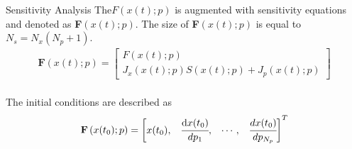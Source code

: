 \documentclass[8pt]{beamer}
\begin{document}
	\begin{frame}[fragile]{Sensitivity Analysis}
		The$F(x(t);p)$ is augmented with sensitivity equations and denoted as \textbf{F}$\left(x(t);p\right)$. The size of \textbf{F}$\left(x(t);p\right)$ is equal to $N_s = N_x(N_p + 1)$.
		\small{
		\begin{align*}
			\textbf{F}\left(x(t);p\right) = 
			\begin{bmatrix}
				F(x(t);p)\\
				J_x(x(t);p)S(x(t);p) + J_p(x(t);p)
			\end{bmatrix}
		\end{align*} } \\
		The initial conditions are described as
		\small{
		\begin{align*}
			\textbf{F}\left(x(t_0);p\right)  = 
			\begin{bmatrix} x(t_0),			& 
				\cfrac{ \text{d}x(t_0) }{ dp_1 },		& 
				\cdots,					 	&
				\cfrac{ dx(t_0) }{ dp_{N_p} } 
			\end{bmatrix}^T
		\end{align*} }
	\end{frame}
\end{document}
